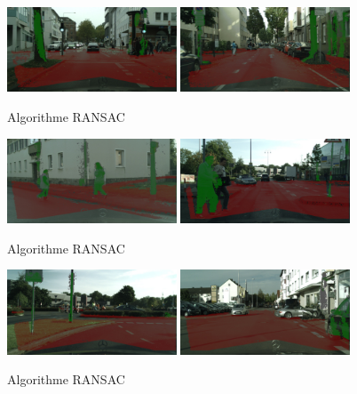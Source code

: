 \documentclass[titlepage,11pt,a4paper]{article}
\begin{document}
\begin{figure}[H]
  \centering
    \includegraphics[width=0.45\textwidth]{images/result_ransac/result_0.jpg}
  \hfill{}
    \includegraphics[width=0.45\textwidth]{images/result_ransac/result_1.jpg}
  \hfill 
  \caption{Algorithme RANSAC}
\end{figure} 
\begin{figure}[H]
  \centering
    \includegraphics[width=0.45\textwidth]{images/result_ransac/result_2.jpg}
  \hfill{}
    \includegraphics[width=0.45\textwidth]{images/result_ransac/result_3.jpg}
  \hfill 
  \caption{Algorithme RANSAC}
\end{figure} 
\begin{figure}[H]
  \centering
    \includegraphics[width=0.45\textwidth]{images/result_ransac/result_4.jpg}
  \hfill{}
    \includegraphics[width=0.45\textwidth]{images/result_ransac/result_5.jpg}
  \hfill 
  \caption{Algorithme RANSAC}
\end{figure} 
\end{document}
